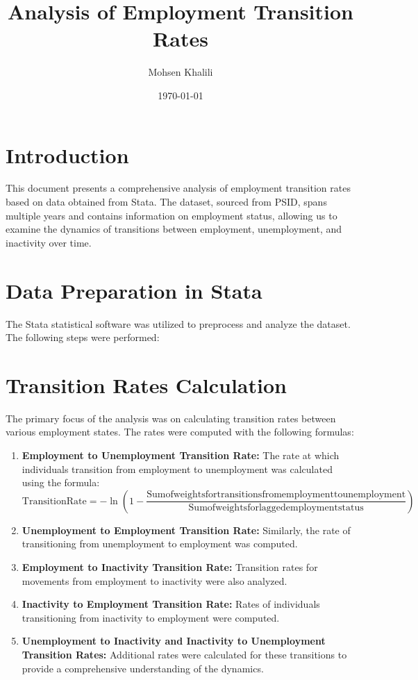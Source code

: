 \documentclass{article}
\begin{document}
	
	\title{Analysis of Employment Transition Rates}
	\author{Mohsen Khalili}
	\date{\today}
	
	\maketitle
	
	\section{Introduction}
	This document presents a comprehensive analysis of employment transition rates based on data obtained from Stata. The dataset, sourced from PSID, spans multiple years and contains information on employment status, allowing us to examine the dynamics of transitions between employment, unemployment, and inactivity over time.
	
	\section{Data Preparation in Stata}
	The Stata statistical software was utilized to preprocess and analyze the dataset. The following steps were performed:
	
	\section{Transition Rates Calculation}
	The primary focus of the analysis was on calculating transition rates between various employment states. The rates were computed with the following formulas:
	
	\begin{enumerate}
		\item \textbf{Employment to Unemployment Transition Rate:} The rate at which individuals transition from employment to unemployment was calculated using the formula:
		\begin{equation}
			\mathrm{Transition Rate} = - \ln \left(1 - \frac{\mathrm{Sum of weights for transitions from employment to unemployment}}{\mathrm{Sum of weights for lagged employment status}}\right)
		\end{equation}
		
		\item \textbf{Unemployment to Employment Transition Rate:} Similarly, the rate of transitioning from unemployment to employment was computed.
		
		\item \textbf{Employment to Inactivity Transition Rate:} Transition rates for movements from employment to inactivity were also analyzed.
		
		\item \textbf{Inactivity to Employment Transition Rate:} Rates of individuals transitioning from inactivity to employment were computed.
		
		\item \textbf{Unemployment to Inactivity and Inactivity to Unemployment Transition Rates:} Additional rates were calculated for these transitions to provide a comprehensive understanding of the dynamics.
	\end{enumerate}
\newpage
\end{document}
